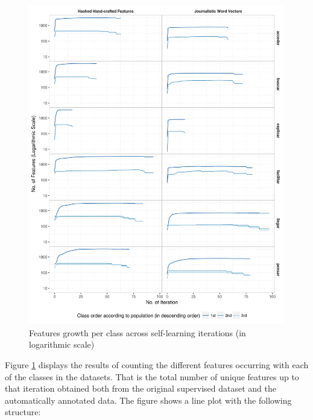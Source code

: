 \begin{figure}[htb!]
  \centering
  \includegraphics[height=.9\textheight,width=\textwidth,keepaspectratio]
    {plots/selflearning/features_growth_per_class}
  \caption{Features growth per class across self-learning iterations (in
  logarithmic scale)}
  \label{fig:self-learning:features_growth_per_class}
\end{figure}

Figure \ref{fig:self-learning:features_growth_per_class} displays the results
of counting the different features occurring with each of the classes in the
datasets. That is the total number of unique features up to that iteration
obtained both from the original supervised dataset and the automatically
annotated data. The figure shows a line plot with the following structure:

